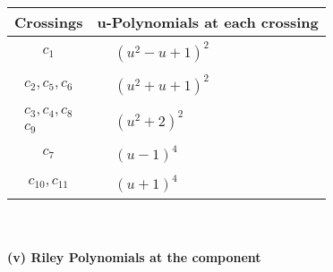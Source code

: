 \documentclass[1p]{elsarticle_modified}
\theoremstyle{definition}
\begin{document}
\begin{tabular}{m{50pt}|m{274pt}}
Crossings & \hspace{64pt}u-Polynomials at each crossing \\
\hline $$\begin{aligned}c_{1}\end{aligned}$$&$\begin{aligned}
&(u^2- u+1)^2
\end{aligned}$\\
\hline $$\begin{aligned}c_{2},c_{5},c_{6}\end{aligned}$$&$\begin{aligned}
&(u^2+u+1)^2
\end{aligned}$\\
\hline $$\begin{aligned}c_{3},c_{4},c_{8}\\c_{9}\end{aligned}$$&$\begin{aligned}
&(u^2+2)^2
\end{aligned}$\\
\hline $$\begin{aligned}c_{7}\end{aligned}$$&$\begin{aligned}
&(u-1)^4
\end{aligned}$\\
\hline $$\begin{aligned}c_{10},c_{11}\end{aligned}$$&$\begin{aligned}
&(u+1)^4
\end{aligned}$\\
\hline
\end{tabular}\\~\\
\newpage\renewcommand{\arraystretch}{1}
\flushleft \textbf{(v) Riley Polynomials at the component}\newline \\
\end{document}

